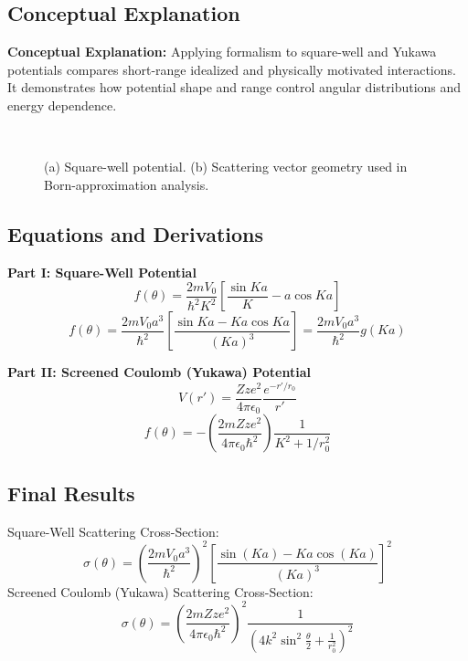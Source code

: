 \documentclass[12pt]{report}
\begin{document}
\subsection{Conceptual Explanation}
\textbf{Conceptual Explanation:} Applying formalism to square-well and Yukawa potentials compares short-range idealized and physically motivated interactions. It demonstrates how potential shape and range control angular distributions and energy dependence.


\begin{figure}[!htbp]
    \centering
    \\
    \vspace{0.25cm}
    
    \caption{(a) Square-well potential. (b) Scattering vector geometry used in Born-approximation analysis.}
\end{figure}

\subsection*{Equations and Derivations}

\textbf{Part I: Square-Well Potential}
\begin{equation}
f(\theta) = \frac{2mV_0}{\hbar^2 K^2} \left[ \frac{\sin Ka}{K} - a \cos Ka \right]
\end{equation}
\begin{equation}
f(\theta) = \frac{2mV_0 a^3}{\hbar^2} \left[ \frac{\sin Ka - Ka \cos Ka}{(Ka)^3} \right] = \frac{2mV_0 a^3}{\hbar^2} g(Ka)
\end{equation}

\textbf{Part II: Screened Coulomb (Yukawa) Potential}
\begin{equation}
V(r') = \frac{Zze^2}{4\pi\epsilon_0} \frac{e^{-r'/r_0}}{r'}
\end{equation}
\begin{equation}
f(\theta) = -\left( \frac{2m Zze^2}{4\pi\epsilon_0 \hbar^2} \right) \frac{1}{K^2 + 1/r_0^2}
\end{equation}

\subsection*{Final Results}
Square-Well Scattering Cross-Section:
\begin{equation}
\boxed{ \sigma(\theta) = \left( \frac{2mV_0 a^3}{\hbar^2} \right)^2 \left[ \frac{\sin(Ka) - Ka \cos(Ka)}{(Ka)^3} \right]^2 }
\end{equation}
Screened Coulomb (Yukawa) Scattering Cross-Section:
\begin{equation}
\boxed{ \sigma(\theta) = \left( \frac{2m Zze^2}{4\pi\epsilon_0 \hbar^2} \right)^2 \frac{1}{\left( 4k^2 \sin^2\frac{\theta}{2} + \frac{1}{r_0^2} \right)^2} }
\end{equation} 
\end{document}
